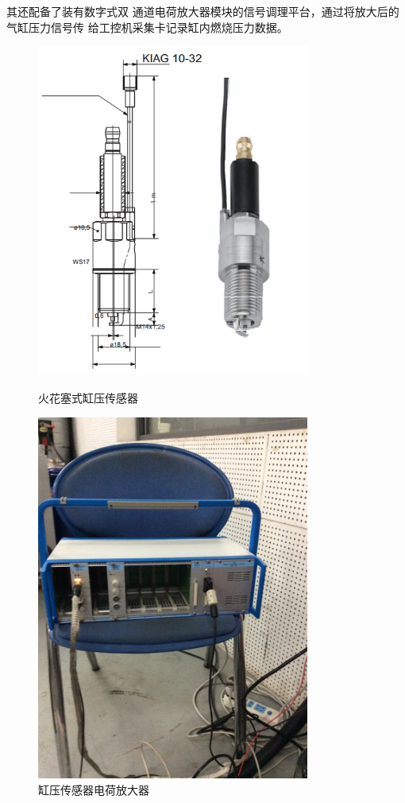 其还配备了装有数字式双
通道电荷放大器模块的信号调理平台，通过将放大后的气缸压力信号传
给工控机采集卡记录缸内燃烧压力数据。\par
\begin{figure}[htb]
	\begin{minipage}[t]{0.5\linewidth}
		\centering
		\includegraphics[width=0.8\textwidth]{thesis_figure/platformer_chapter/gycgq}
		\caption{火花塞式缸压传感器}
		\label{fig:gycgq}
	\end{minipage}
	\begin{minipage}[t]{0.5\linewidth}
		\centering
		\includegraphics[width=0.8\textwidth]{thesis_figure/platformer_chapter/gycgqdhfdq}
		\caption{缸压传感器电荷放大器}
		\label{fig:gycgqdhfdq}
	\end{minipage}
\end{figure}
